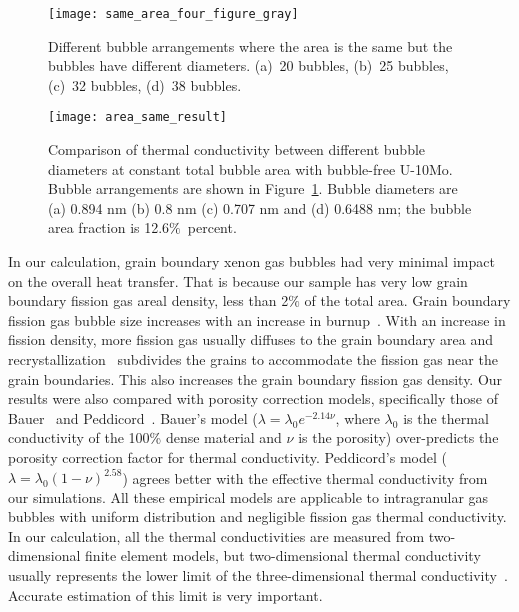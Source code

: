  
\begin{figure}
	\centering
	\texttt{[image: same\_area\_four\_figure\_gray]}
    \caption{Different bubble arrangements where the area is the same but the
      bubbles have different diameters. (a)~20 bubbles, (b)~25 bubbles,
      (c)~32 bubbles, (d)~38 bubbles.}
	\label{fig:area_same_four}
\end{figure}
\begin{figure}
	\centering
	\texttt{[image: area\_same\_result]}
	\caption[Comparison of thermal conductivity between different bubble 
      diameters at constant total bubble area with bubble-free U-10Mo. Bubble
      arrangements are shown in Figure~\ref{fig:area_same_four}]{Comparison of thermal conductivity between different bubble 
      diameters at constant total bubble area with bubble-free U-10Mo. Bubble
      arrangements are shown in Figure~\ref{fig:area_same_four}.
      Bubble diameters are (a) 0.894 nm (b) 0.8 nm (c) 0.707 nm and (d) 0.6488 nm;
      the bubble area fraction is 12.6$\%$~percent.}
	\label{fig:four_results}
\end{figure}

In our calculation, grain boundary xenon gas bubbles had very minimal impact on the overall heat transfer. That is because our sample has very low grain boundary fission gas areal density, less than 2$\%$ of the total area. Grain boundary fission gas bubble size increases with an increase in burnup~\cite{kim2011fission}.
With an increase in fission density, more fission gas usually diffuses to the grain boundary area and recrystallization~\cite{kim2013recrystallization} subdivides the grains to accommodate the fission gas near the grain boundaries.
This also increases the grain boundary fission gas density. Our results were also compared with porosity correction models, specifically those of Bauer~\cite{bauer1995pile} and Peddicord~\cite{peddicord1978porosity}. Bauer's model ($\lambda=\lambda_0 e^{-2.14\nu}$, where $\lambda_0$ is the thermal conductivity of the 100\% dense material and $\nu$ is the porosity) over-predicts the porosity correction factor for thermal conductivity. Peddicord's model ($\lambda=\lambda_0(1-\nu)^{2.58}$) agrees better with the effective thermal conductivity from our simulations. All these empirical models are applicable to intragranular gas bubbles with uniform distribution and negligible fission gas thermal conductivity.
In our calculation, all the thermal conductivities are measured from two-dimensional finite element models, but two-dimensional thermal conductivity usually represents the lower limit of the three-dimensional thermal conductivity~\cite{bakker1995determination}. Accurate estimation of this limit is very important. 


